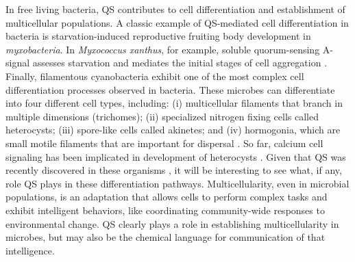 In free living bacteria, QS contributes to cell differentiation and establishment of multicellular populations. A classic example of QS-mediated cell differentiation in bacteria is starvation-induced reproductive fruiting body development in \textit{myxobacteria}. In \textit{Myxococcus xanthus}, for example, soluble quorum-sensing A-signal assesses starvation and mediates the initial stages of cell aggregation \cite{kaiser_signaling_2004}. Finally, filamentous cyanobacteria exhibit one of the most complex cell differentiation processes observed in bacteria. These microbes can differentiate into four different cell types, including: (i) multicellular filaments that branch in multiple dimensions (trichomes);  (ii) specialized nitrogen fixing cells called heterocysts; (iii) spore-like cells called akinetes; and (iv) hormogonia, which are small motile filaments that are important for dispersal \cite{flores_compartmentalized_2010,schirrmeister_origin_2011}. So far, calcium cell signaling has been implicated in development of heterocysts \cite{torrecilla_calcium_2004}. Given that QS was recently discovered in these organisms \cite{sharif_quorum_2008}, it will be interesting to see what, if any, role QS plays in these differentiation pathways. Multicellularity, even in microbial populations, is an adaptation that allows cells to perform complex tasks and exhibit intelligent behaviors, like coordinating community-wide responses to environmental change. QS clearly plays a role in establishing multicellularity in microbes, but may also be the chemical language for communication of that intelligence.

